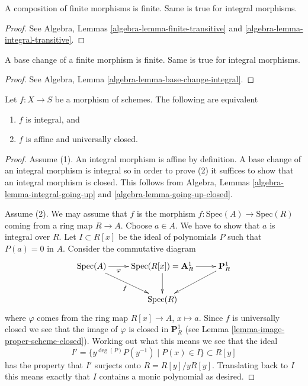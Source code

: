\begin{lemma}
\label{lemma-composition-finite}
A composition of finite morphisms is finite.
Same is true for integral morphisms.
\end{lemma}

\begin{proof}
See Algebra, Lemmas \ref{algebra-lemma-finite-transitive}
and \ref{algebra-lemma-integral-transitive}.
\end{proof}

\begin{lemma}
\label{lemma-base-change-finite}
A base change of a finite morphism is finite.
Same is true for integral morphisms.
\end{lemma}

\begin{proof}
See Algebra, Lemma \ref{algebra-lemma-base-change-integral}.
\end{proof}

\begin{lemma}
\label{lemma-integral-universally-closed}
Let $f : X \to S$ be a morphism of schemes.
The following are equivalent
\begin{enumerate}
\item $f$ is integral, and
\item $f$ is affine and universally closed.
\end{enumerate}
\end{lemma}

\begin{proof}
Assume (1). An integral morphism is affine by definition.
A base change of an integral morphism is integral so in order to prove (2)
it suffices to show that an integral morphism is closed.
This follows from Algebra, Lemmas \ref{algebra-lemma-integral-going-up}
and \ref{algebra-lemma-going-up-closed}.

\medskip\noindent
Assume (2). We may assume that $f$ is the morphism
$f : \text{Spec}(A) \to \text{Spec}(R)$ coming from a ring
map $R \to A$. Choose $a \in A$. We have to show that $a$
is integral over $R$. Let $I \subset R[x]$ be the ideal of
polynomials $P$ such that $P(a) = 0$ in $A$. Consider the commutative
diagram
$$
\xymatrix{
\text{Spec}(A) \ar[r]_-\varphi \ar[rd]_f &
\text{Spec}(R[x]) = \mathbf{A}^1_R \ar[r] \ar[d] &
\mathbf{P}^1_R  \ar[ld] \\
& \text{Spec}(R) &
}
$$
where $\varphi$ comes from the ring map $R[x] \to A$, $x \mapsto a$.
Since $f$ is universally closed we see that the image of $\varphi$
is closed in $\mathbf{P}^1_R$
(see Lemma \ref{lemma-image-proper-scheme-closed}). Working
out what this means we see that the ideal
$$
I' = \{ y^{\deg(P)}P(y^{-1}) \mid P(x) \in I \} \subset R[y]
$$
has the property that $I'$ surjects onto $R = R[y]/yR[y]$.
Translating back to $I$ this means exactly that $I$ contains
a monic polynomial as desired.
\end{proof}

